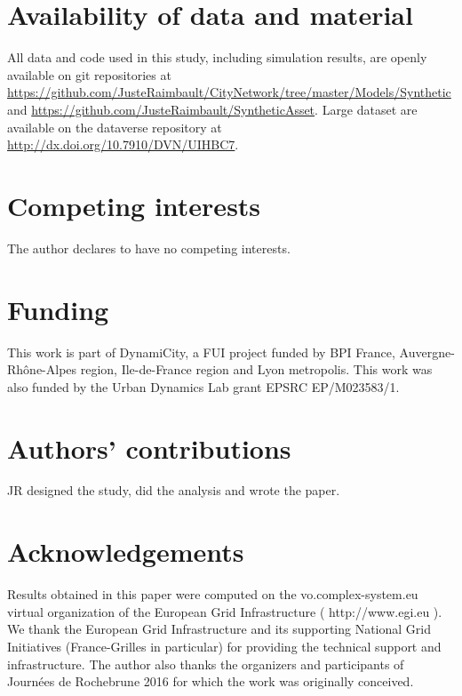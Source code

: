 \documentclass{bmcart}
\begin{document}
\begin{backmatter}


\section*{Availability of data and material}

All data and code used in this study, including simulation results, are openly available on git repositories at \url{https://github.com/JusteRaimbault/CityNetwork/tree/master/Models/Synthetic} and \url{https://github.com/JusteRaimbault/SyntheticAsset}. Large dataset are available on the dataverse repository at \url{http://dx.doi.org/10.7910/DVN/UIHBC7}.

\vspace{-0.2cm}


\section*{Competing interests}

The author declares to have no competing interests.

\vspace{-0.2cm}

\section*{Funding}

This work is part of DynamiCity, a FUI project funded by BPI France, Auvergne-Rh{\^o}ne-Alpes region, Ile-de-France region and Lyon metropolis. This work was also funded by the Urban Dynamics Lab grant EPSRC EP/M023583/1.

\vspace{-0.2cm}

\section*{Authors' contributions}

JR designed the study, did the analysis and wrote the paper.

\vspace{-0.2cm}

\section*{Acknowledgements}

Results obtained in this paper were computed on the vo.complex-system.eu virtual organization of the European Grid Infrastructure ( http://www.egi.eu ). We thank the European Grid Infrastructure and its supporting National Grid Initiatives (France-Grilles in particular) for providing the technical support and infrastructure. The author also thanks the organizers and participants of Journ{\'e}es de Rochebrune 2016 for which the work was originally conceived.



\end{backmatter}
\end{document}
